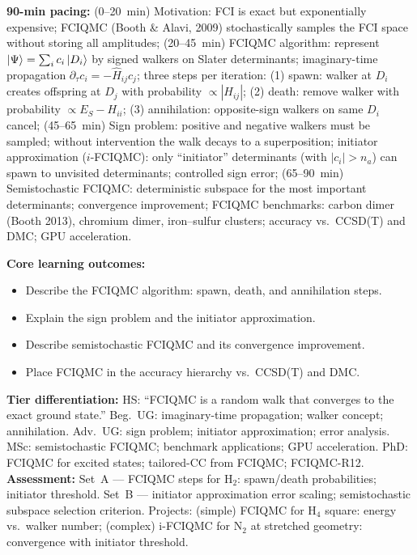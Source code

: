 \documentclass[11pt,a4paper]{article}
\begin{document}
\begin{tcolorbox}[chembox, title={Module~III.3 / L10: Full CI Quantum Monte Carlo (FCIQMC)}]
\textbf{90-min pacing:} (0--20~min) Motivation: FCI is exact but exponentially expensive; FCIQMC (Booth \& Alavi, 2009) stochastically samples the FCI space without storing all amplitudes; (20--45~min) FCIQMC algorithm: represent $\ket{\Psi}=\sum_i c_i\ket{D_i}$ by signed walkers on Slater determinants; imaginary-time propagation $\partial_\tau c_i=-\hat{H}_{ij}c_j$; three steps per iteration: (1) spawn: walker at $D_i$ creates offspring at $D_j$ with probability $\propto|H_{ij}|$; (2) death: remove walker with probability $\propto E_S-H_{ii}$; (3) annihilation: opposite-sign walkers on same $D_i$ cancel; (45--65~min) Sign problem: positive and negative walkers must be sampled; without intervention the walk decays to a superposition; initiator approximation ($i$-FCIQMC): only ``initiator'' determinants (with $|c_i|>n_a$) can spawn to unvisited determinants; controlled sign error; (65--90~min) Semistochastic FCIQMC: deterministic subspace for the most important determinants; convergence improvement; FCIQMC benchmarks: carbon dimer (Booth 2013), chromium dimer, iron--sulfur clusters; accuracy vs.\ CCSD(T) and DMC; GPU acceleration.

\medskip\textbf{Core learning outcomes:}
\begin{itemize}[leftmargin=1.4em,topsep=2pt,itemsep=1pt]
  \item Describe the FCIQMC algorithm: spawn, death, and annihilation steps.
  \item Explain the sign problem and the initiator approximation.
  \item Describe semistochastic FCIQMC and its convergence improvement.
  \item Place FCIQMC in the accuracy hierarchy vs.\ CCSD(T) and DMC.
\end{itemize}
\medskip\textbf{Tier differentiation:}
HS: ``FCIQMC is a random walk that converges to the exact ground state.''
Beg.\ UG: imaginary-time propagation; walker concept; annihilation.
Adv.\ UG: sign problem; initiator approximation; error analysis.
MSc: semistochastic FCIQMC; benchmark applications; GPU acceleration.
PhD: FCIQMC for excited states; tailored-CC from FCIQMC; FCIQMC-R12.
\medskip\textbf{Assessment:}
Set~A --- FCIQMC steps for H$_2$: spawn/death probabilities; initiator threshold.
Set~B --- initiator approximation error scaling; semistochastic subspace selection criterion.
Projects: (simple) FCIQMC for H$_4$ square: energy vs.\ walker number; (complex) i-FCIQMC for N$_2$ at stretched geometry: convergence with initiator threshold.
\end{tcolorbox}
\end{document}

